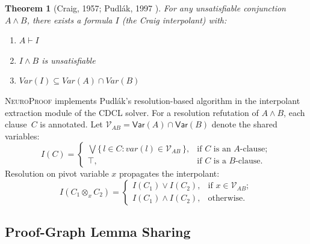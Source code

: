 \documentclass[conference]{IEEEtran}
\newtheorem{theorem}{Theorem}[section]
\newcommand{\proves}{\vdash}
\newcommand{\dland}{\mathbin{\wedge}}
\newcommand{\dlor}{\mathbin{\vee}}
\newcommand{\dltop}{\top}
\newcommand{\Var}{\mathsf{Var}}
\newcommand{\NP}{\textsc{NeuroProof}}
\begin{document}
\begin{theorem}[Craig, 1957; Pudl\'{a}k, 1997 \cite{Krajicek1995}]
  For any unsatisfiable conjunction $A \wedge B$, there exists a
  formula $I$ (the \emph{Craig interpolant}) with:
  \begin{enumerate}
    \item[(i)]   $A \proves I$
    \item[(ii)]  $I \wedge B$ is unsatisfiable
    \item[(iii)] $\mathit{Var}(I) \subseteq
      \mathit{Var}(A) \cap \mathit{Var}(B)$
  \end{enumerate}
\end{theorem}

\NP{} implements Pudl\'{a}k's resolution-based algorithm in
the interpolant extraction module of the CDCL solver.  For a resolution
refutation of $A \wedge B$, each clause~$C$ is annotated.
Let $\mathcal{V}_{AB} = \Var(A) \cap \Var(B)$ denote the shared variables:
\begin{equation}
  I(C) = \begin{cases}
    \bigvee\{\,l \in C :
      \mathit{var}(l) \in \mathcal{V}_{AB}\,\},
      & \text{if $C$ is an $A$-clause}; \\[4pt]
    \dltop, & \text{if $C$ is a $B$-clause}.
  \end{cases}
\end{equation}
Resolution on pivot variable $x$ propagates the interpolant:
\begin{equation}
  I(C_1 \otimes_x C_2) =
  \begin{cases}
    I(C_1) \dlor I(C_2),
      & \text{if } x \in \mathcal{V}_{AB}; \\[4pt]
    I(C_1) \dland I(C_2),
      & \text{otherwise}.
  \end{cases}
\end{equation}

\subsection{Proof-Graph Lemma Sharing}
\end{document}
